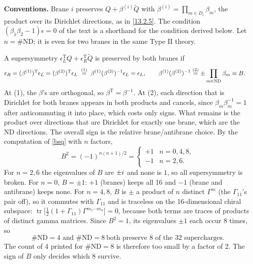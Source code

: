 \begin{tcolorbox}[breakable]
	\begin{remark}
		\textbf{Conventions.} Brane $i$ preserves $Q+\beta^{(i)}\tilde Q$ with $\beta^{(i)}=\prod_{m\in D_i}\beta_m$, the product over its Dirichlet directions, as in \eqref{13.2.5}. The condition $(\beta_1\beta_2-1)\epsilon=0$ of the text is a shorthand for the condition derived below. Let $n=\#\mathrm{ND}$; it is even for two branes in the same Type II theory.

		A supersymmetry $\epsilon_L^{\mathrm T}Q+\epsilon_R^{\mathrm T}\tilde Q$ is preserved by both branes if
		\begin{align*}
			\epsilon_R = (\beta^{(1)})^{\mathrm T}\epsilon_L = (\beta^{(2)})^{\mathrm T}\epsilon_L
			\;&\overset{(1)}{=}\; \beta^{(1)}(\beta^{(2)})^{-1}\epsilon_L=\epsilon_L ,\qquad
			\beta^{(1)}(\beta^{(2)})^{-1} \overset{(2)}{=} \pm\prod_{m\in\mathrm{ND}}\beta_m \equiv B .
		\end{align*}
		At (1), the $\beta$'s are orthogonal, so $\beta^{\mathrm T}=\beta^{-1}$. At (2), each direction that is Dirichlet for both branes appears in both products and cancels, since $\beta_m\beta_m^{-1}=1$ after anticommuting it into place, which costs only signs. What remains is the product over directions that are Dirichlet for exactly one brane, which are the ND directions. The overall sign is the relative brane/antibrane choice. By the computation of \eqref{bsq} with $n$ factors,
		\begin{equation*}
			B^2=(-1)^{n(n+1)/2}=\begin{cases} +1 & n=0,4,8,\\ -1 & n=2,6.\end{cases}
		\end{equation*}
		For $n=2,6$ the eigenvalues of $B$ are $\pm i$ and none is $1$, so all supersymmetry is broken. For $n=0$, $B=\pm1$: $+1$ (branes) keeps all 16 and $-1$ (brane and antibrane) keeps none. For $n=4,8$, $B$ is $\pm$ a product of $n$ distinct $\Gamma^m$ (the $\Gamma_{11}$'s pair off), so it commutes with $\Gamma_{11}$ and is traceless on the 16-dimensional chiral subspace: $\operatorname{tr}\bigl[\frac12(1+\Gamma_{11})\Gamma^{m_1\cdots m_n}\bigr]=0$, because both terms are traces of products of distinct gamma matrices. Since $B^2=1$, its eigenvalues $\pm1$ each occur 8 times, so
		\begin{equation*}
			\boxed{\#\mathrm{ND}=4\text{ and }\#\mathrm{ND}=8\ \text{both preserve 8 of the 32 supercharges}.}
		\end{equation*}
		The count of 4 printed for $\#\mathrm{ND}=8$ is therefore too small by a factor of 2. The sign of $B$ only decides which 8 survive.
	\end{remark}
\end{tcolorbox}

